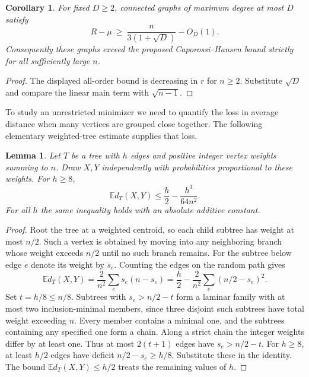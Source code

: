 \documentclass[11pt,a4paper]{article}
\newtheorem{lemma}[theorem]{Lemma}
\newtheorem{corollary}[theorem]{Corollary}
\theoremstyle{remark}\newtheorem*{remark}{Remark}
\begin{document}
\begin{corollary}\label{cor:fixedDelta}
For fixed $D\ge2$, connected graphs of maximum degree at most $D$ satisfy
\[
 R-\mu\ \ge\ \frac{n}{3(1+\sqrt D)}-O_D(1).
\]
Consequently these graphs exceed the proposed Caporossi--Hansen bound
strictly for all sufficiently large $n$.
\end{corollary}
\begin{proof}
The displayed all-order bound is decreasing in $r$ for $n\ge2$.
Substitute $\sqrt D$ and compare the linear main term with $\sqrt{n-1}$.
\end{proof}

To study an unrestricted minimizer we need to quantify the loss in average
distance when many vertices are grouped close together.  The following
elementary weighted-tree estimate supplies that loss.

\begin{lemma}\label{lem:gapweightedtree}
Let $T$ be a tree with $h$ edges and positive integer vertex weights summing
to $n$. Draw $X,Y$ independently with probabilities proportional to these
weights. For $h\ge8$,
\[
 \mathbb E d_T(X,Y)\le \frac h2-\frac{h^3}{64n^2}.
\]
For all $h$ the same inequality holds with an absolute additive constant.
\end{lemma}
\begin{proof}
Root the tree at a weighted centroid, so each child subtree has weight at
most $n/2$. Such a vertex is obtained by moving into any neighboring branch
whose weight exceeds $n/2$ until no such branch remains. For the subtree below
edge $e$ denote its weight by $s_e$. Counting the edges on the random path gives
\[
 \mathbb E d_T(X,Y)=\frac2{n^2}\sum_e s_e(n-s_e)
  =\frac h2-\frac2{n^2}\sum_e(n/2-s_e)^2 .
\]
Set $t=h/8\le n/8$. Subtrees with $s_e>n/2-t$ form a laminar family
with at most two inclusion-minimal members, since three disjoint such
subtrees have total weight exceeding $n$. Every member contains a minimal
one, and the subtrees containing any specified one form a chain. Along a
strict chain the integer weights differ by at least one. Thus at most
$2(t+1)$ edges have $s_e>n/2-t$. For $h\ge8$, at least $h/2$ edges
have deficit $n/2-s_e\ge h/8$. Substitute these in the identity. The
bound $\mathbb E d_T(X,Y)\le h/2$ treats the remaining values of $h$.
\end{proof}
\end{document}
